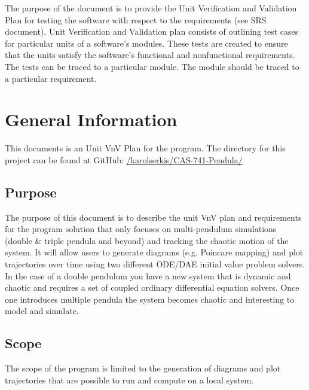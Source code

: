 \documentclass[12pt, titlepage]{article}
\begin{document}
\newpage

\tableofcontents

\listoftables


\newpage


The purpose of the document is to provide the Unit Verification and Validation Plan for testing the \progname{}software with 
respect to the requirements (see SRS document). Unit Verification and 
Validation plan consists of outlining test cases for particular units of a 
software's modules. These tests are created to ensure that the units satisfy 
the software's functional and nonfunctional requirements. The tests can be 
traced to a particular module. The module should be traced to a particular 
requirement. 

\section{General Information}

This documents is an Unit VnV Plan for the \progname program. The
directory for this project can be found at GitHub:
\href{https://github.com/karolserkis/CAS-741-Pendula/}{/karolserkis/CAS-741-Pendula/}\\

\subsection{Purpose}

The purpose of this document is to describe the unit VnV plan and requirements for the
\progname program solution that
only focuses on multi-pendulum simulations (double \& triple pendula and beyond) and tracking the chaotic
motion of the system. It will allow users to generate diagrams (e.g. Poincare
mapping)
and plot trajectories over time using two different ODE/DAE initial value
problem solvers. In the case of
a double pendulum you have a new system that is dynamic and chaotic and
requires a set of coupled ordinary differential equation solvers. Once one
introduces
multiple
pendula the system becomes chaotic and interesting to model and simulate. 

\subsection{Scope}

The scope of the \progname program is limited to the generation 
of diagrams and plot trajectories that are possible to run and compute on a
local system.
\end{document}
